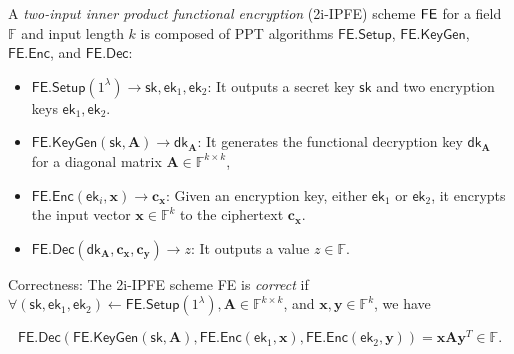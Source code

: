 \begin{definition}
\label{def:2i-IPFE}
	A \emph{two-input inner product functional encryption} (2i-IPFE) scheme $\sf FE$ for a field $\mathbb{F}$ and input length $k$ is composed of PPT algorithms $\textsf{FE.Setup}$, $\textsf{FE.KeyGen}$, $\textsf{FE.Enc}$, and $\textsf{FE.Dec}$:

	\begin{itemize}
	
		\item $\textsf{FE.Setup}(1^\lambda) \to \textsf{sk}, \textsf{ek}_1, \textsf{ek}_2$: It outputs a secret key $\textsf{sk}$ and two encryption keys $\textsf{ek}_1, \textsf{ek}_2$.
	
		\item $\textsf{FE.KeyGen}(\textsf{sk}, \mathbf{A}) \to \textsf{dk}_\mathbf{A}$: It generates the functional decryption key $\textsf{dk}_\mathbf{A}$ for a diagonal matrix $\mathbf{A} \in \mathbb{F}^{k \times k}$,  
	
		\item $\textsf{FE.Enc}(\textsf{ek}_i, \mathbf{x}) \to \mathbf{c_x}$: Given an encryption key, either $\textsf{ek}_1$ or $\textsf{ek}_2$, it encrypts the input vector $\mathbf{x} \in \mathbb{F}^k$ to the ciphertext $\mathbf{c_x}$. 
	
		\item $\textsf{FE.Dec}(\textsf{dk}_\mathbf{A}, \mathbf{c_x}, \mathbf{c_y}) \to z$: It outputs a value $z \in \mathbb{F}$.
	
	\end{itemize}
	
	\noindent Correctness: The 2i-IPFE scheme \textsf{FE} is \emph{correct} if $\forall (\textsf{sk}, \textsf{ek}_1, \textsf{ek}_2) \gets \textsf{FE.Setup}(1^\lambda), \mathbf{A} \in \mathbb{F}^{k \times k}$, and $\mathbf{x}, \mathbf{y} \in \mathbb{F}^k$, we have

	\[
		\textsf{FE.Dec}(\textsf{FE.KeyGen}(\textsf{sk},  \mathbf{A}), \textsf{FE.Enc}(\textsf{ek}_1, \mathbf{x}), \textsf{FE.Enc}(\textsf{ek}_2, \mathbf{y}) ) = \mathbf{x} \mathbf{A} \mathbf{y}^T \in \mathbb{F}.
	\]

\end{definition}


